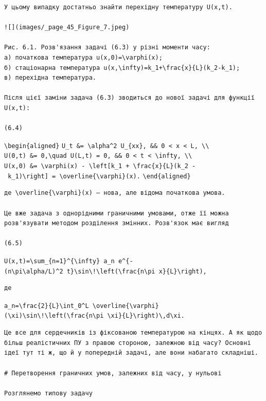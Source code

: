 \documentclass[
  ukrainian,
]{article}
\begin{document}
\begin{verbatim}
У цьому випадку достатньо знайти перехідну температуру U(x,t).

![](images/_page_45_Figure_7.jpeg)

Рис. 6.1. Розв'язання задачі (6.3) у різні моменти часу:
а) початкова температура u(x,0)=\varphi(x);
б) стаціонарна температура u(x,\infty)=k_1+\frac{x}{L}(k_2-k_1);
в) перехідна температура.

Після цієї заміни задача (6.3) зводиться до нової задачі для функції U(x,t):

(6.4)
\end{verbatim}

\texttt{\textbackslash{}begin\{aligned\}}
\texttt{U\_t\ \&=\ \textbackslash{}alpha\^{}2\ U\_\{xx\},\ \&\&\ 0\ \textless{}\ x\ \textless{}\ L,\ \textbackslash{}\textbackslash{}}
\texttt{U(0,t)\ \&=\ 0,\textbackslash{}quad\ U(L,t)\ =\ 0,\ \&\&\ 0\ \textless{}\ t\ \textless{}\ \textbackslash{}infty,\ \textbackslash{}\textbackslash{}}
\texttt{U(x,0)\ \&=\ \textbackslash{}varphi(x)\ -\ \textbackslash{}left{[}k\_1\ +\ \textbackslash{}frac\{x\}\{L\}(k\_2\ -\ k\_1)\textbackslash{}right{]}\ =\ \textbackslash{}overline\{\textbackslash{}varphi\}(x).}
\texttt{\textbackslash{}end\{aligned\}}

\begin{verbatim}
де \overline{\varphi}(x) — нова, але відома початкова умова.

Це вже задача з однорідними граничними умовами, отже її можна розв'язувати методом розділення змінних. Розв'язок має вигляд

(6.5)
\end{verbatim}

\texttt{U(x,t)=\textbackslash{}sum\_\{n=1\}\^{}\{\textbackslash{}infty\}\ a\_n\ e\^{}\{-(n\textbackslash{}pi\textbackslash{}alpha/L)\^{}2\ t\}\textbackslash{}sin\textbackslash{}!\textbackslash{}left(\textbackslash{}frac\{n\textbackslash{}pi\ x\}\{L\}\textbackslash{}right),}

\begin{verbatim}
де
\end{verbatim}

\texttt{a\_n=\textbackslash{}frac\{2\}\{L\}\textbackslash{}int\_0\^{}L\ \textbackslash{}overline\{\textbackslash{}varphi\}(\textbackslash{}xi)\textbackslash{}sin\textbackslash{}!\textbackslash{}left(\textbackslash{}frac\{n\textbackslash{}pi\ \textbackslash{}xi\}\{L\}\textbackslash{}right)\textbackslash{},d\textbackslash{}xi.}

\begin{verbatim}
Це все для сердечників із фіксованою температурою на кінцях. А як щодо більш реалістичних ПУ з правою стороною, залежною від часу? Основні ідеї тут ті ж, що й у попередній задачі, але вони набагато складніші.

# Перетворення граничних умов, залежних від часу, у нульові

Розглянемо типову задачу
\end{verbatim}
\end{document}
